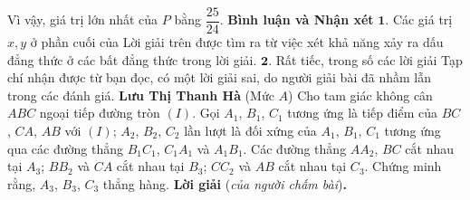 \begin{multicols}{2}
	\vskip 0.05cm
	Vì vậy, giá trị lớn nhất của $P$ bằng  $\dfrac{25}{24}$.
	\vskip 0.05cm
	\textbf{Bình luận và Nhận xét}
	\vskip 0.05cm
	$\pmb{1.}$ Các giá trị $x, y$ ở phần cuối của Lời giải trên được tìm ra từ việc xét khả năng xảy ra dấu đẳng thức ở các bất đẳng thức trong lời giải.
	\vskip 0.05cm
	$\pmb{2.}$ Rất tiếc, trong số các lời giải Tạp chí nhận được từ bạn đọc, có một lời giải sai, do người giải bài đã nhầm lẫn trong các đánh giá.
	\vskip 0.05cm
	\hfill\textbf{Lưu Thị Thanh Hà}
	\vskip 0.05cm
	{}
	(Mức $A$) Cho tam giác không cân $ABC$ ngoại tiếp đường tròn $(I)$. Gọi $A_1$, $B_1$, $C_1$ tương ứng là tiếp điểm của $BC$, $CA$, $AB$ với $(I)$; $A_2$, $B_2$, $C_2$ lần lượt là đối xứng của $A_1$, $B_1$, $C_1$ tương ứng qua các đường thẳng $B_1C_1$, $C_1A_1$ và $A_1B_1$. Các đường thẳng $AA_2$, $BC$ cắt nhau tại $A_3$; $BB_2$ và $CA$ cắt nhau tại $B_3$; $CC_2$ và $AB$ cắt nhau tại $C_3$. Chứng minh rằng, $A_3$, $B_3$, $C_3$ thẳng hàng.
	\vskip 0.05cm
	\textbf{Lời giải} (\textit{của người chấm bài})\textbf{.}
	

\end{multicols}
